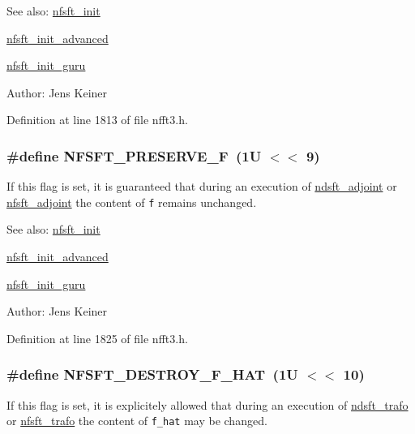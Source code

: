 \begin{Desc}
\item[See also:]\hyperlink{group__nfsft_ga1}{nfsft\_\-init} 

\hyperlink{group__nfsft_ga2}{nfsft\_\-init\_\-advanced} 

\hyperlink{group__nfsft_ga3}{nfsft\_\-init\_\-guru} \end{Desc}
\begin{Desc}
\item[Author:]Jens Keiner \end{Desc}


Definition at line 1813 of file nfft3.h.\hypertarget{group__nfsft_ga33}{
\subsubsection[NFSFT\_\-PRESERVE\_\-F]{\setlength{\rightskip}{0pt plus 5cm}\#define NFSFT\_\-PRESERVE\_\-F~(1U $<$$<$ 9)}}
\label{group__nfsft_ga33}


If this flag is set, it is guaranteed that during an execution of \hyperlink{group__nfsft_ga7}{ndsft\_\-adjoint} or \hyperlink{group__nfsft_ga9}{nfsft\_\-adjoint} the content of {\tt f} remains unchanged. 

\begin{Desc}
\item[See also:]\hyperlink{group__nfsft_ga1}{nfsft\_\-init} 

\hyperlink{group__nfsft_ga2}{nfsft\_\-init\_\-advanced} 

\hyperlink{group__nfsft_ga3}{nfsft\_\-init\_\-guru} \end{Desc}
\begin{Desc}
\item[Author:]Jens Keiner \end{Desc}


Definition at line 1825 of file nfft3.h.\hypertarget{group__nfsft_ga34}{
\subsubsection[NFSFT\_\-DESTROY\_\-F\_\-HAT]{\setlength{\rightskip}{0pt plus 5cm}\#define NFSFT\_\-DESTROY\_\-F\_\-HAT~(1U $<$$<$ 10)}}
\label{group__nfsft_ga34}


If this flag is set, it is explicitely allowed that during an execution of \hyperlink{group__nfsft_ga6}{ndsft\_\-trafo} or \hyperlink{group__nfsft_ga8}{nfsft\_\-trafo} the content of {\tt f\_\-hat} may be changed. 

